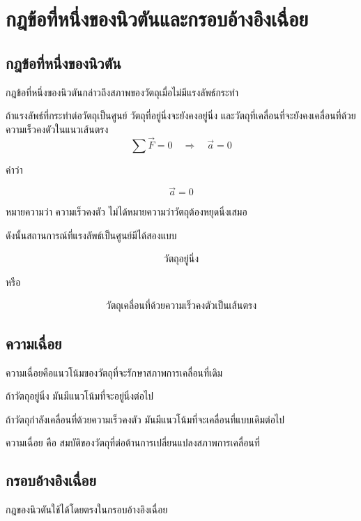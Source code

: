 \section{กฎข้อที่หนึ่งของนิวตันและกรอบอ้างอิงเฉื่อย}

\subsection{กฎข้อที่หนึ่งของนิวตัน}

กฎข้อที่หนึ่งของนิวตันกล่าวถึงสภาพของวัตถุเมื่อไม่มีแรงลัพธ์กระทำ

\begin{tcolorbox}[title=กฎข้อที่หนึ่งของนิวตัน]
ถ้าแรงลัพธ์ที่กระทำต่อวัตถุเป็นศูนย์ วัตถุที่อยู่นิ่งจะยังคงอยู่นิ่ง และวัตถุที่เคลื่อนที่จะยังคงเคลื่อนที่ด้วยความเร็วคงตัวในแนวเส้นตรง
\[
\sum \vec{F}=0
\quad \Rightarrow \quad
\vec{a}=0
\]
\end{tcolorbox}

คำว่า

\[
\vec{a}=0
\]

หมายความว่า ความเร็วคงตัว ไม่ได้หมายความว่าวัตถุต้องหยุดนิ่งเสมอ

ดังนั้นสถานการณ์ที่แรงลัพธ์เป็นศูนย์มีได้สองแบบ

\[
\text{วัตถุอยู่นิ่ง}
\]

หรือ

\[
\text{วัตถุเคลื่อนที่ด้วยความเร็วคงตัวเป็นเส้นตรง}
\]

\subsection{ความเฉื่อย}

ความเฉื่อยคือแนวโน้มของวัตถุที่จะรักษาสภาพการเคลื่อนที่เดิม

ถ้าวัตถุอยู่นิ่ง มันมีแนวโน้มที่จะอยู่นิ่งต่อไป

ถ้าวัตถุกำลังเคลื่อนที่ด้วยความเร็วคงตัว มันมีแนวโน้มที่จะเคลื่อนที่แบบเดิมต่อไป

\begin{tcolorbox}[title=นิยาม]
ความเฉื่อย คือ สมบัติของวัตถุที่ต่อต้านการเปลี่ยนแปลงสภาพการเคลื่อนที่
\end{tcolorbox}

\subsection{กรอบอ้างอิงเฉื่อย}

กฎของนิวตันใช้ได้โดยตรงในกรอบอ้างอิงเฉื่อย


